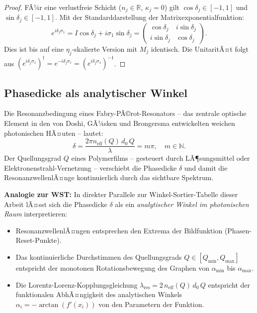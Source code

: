 ﻿\documentclass[12pt, a4paper]{article}
\theoremstyle{definition}
\begin{document}
	\begin{proof}
		FÃ¼r eine verlustfreie Schicht ($n_j \in \mathbb{R}$, $\kappa_j = 0$) gilt
		$\cos\delta_j \in [-1,1]$ und $\sin\delta_j \in [-1,1]$.
		Mit der Standarddarstellung der Matrixexponentialfunktion:
		\[
		e^{i\delta_j \sigma_1} = I\cos\delta_j + i\sigma_1\sin\delta_j
		= \begin{pmatrix}\cos\delta_j & i\sin\delta_j \\ i\sin\delta_j & \cos\delta_j\end{pmatrix}.
		\]
		Dies ist bis auf eine $\eta_j$-skalierte Version mit $M_j$ identisch.
		Die UnitaritÃ¤t folgt aus $(e^{i\delta_j\sigma_1})^\dagger = e^{-i\delta_j\sigma_1} = (e^{i\delta_j\sigma_1})^{-1}$.
	\end{proof}
	
	\subsection{Phasedicke als analytischer Winkel}
	
	Die Resonanzbedingung eines Fabry-PÃ©rot-Resonators -- das zentrale optische
	Element in den von Doshi, GÃ¼sken und Brongersma \cite{oqtum} entwickelten
	weichen photonischen HÃ¤uten -- lautet:
	\[
	\delta = \frac{2\pi n_\mathrm{eff}(Q)\, d_0\, Q}{\lambda} = m\pi, \quad m \in \mathbb{N}.
	\]
	Der Quellungsgrad $Q$ eines Polymerfilms -- gesteuert durch LÃ¶sungsmittel
	oder Elektronen\-strahl-Vernetzung -- verschiebt die Phasedicke $\delta$ und
	damit die ResonanzwellenlÃ¤nge kontinuierlich durch das sichtbare Spektrum.
	
	\medskip
	\noindent\textbf{Analogie zur WST:} In direkter Parallele zur
	Winkel-Sortier-Tabelle dieser Arbeit lÃ¤sst sich die Phasedicke $\delta$ als
	ein \emph{analytischer Winkel im photonischen Raum} interpretieren:
	\begin{itemize}
		\item ResonanzwellenlÃ¤ngen entsprechen den Extrema der Bildfunktion (Phasen-Reset-Punkte).
		\item Das kontinuierliche Durchstimmen des Quellungsgrads $Q \in [Q_\mathrm{min}, Q_\mathrm{max}]$
		entspricht der monotonen Rotationsbewegung des Graphen von
		$\alpha_\mathrm{min}$ bis $\alpha_\mathrm{max}$.
		\item Die Lorentz-Lorenz-Kopplungsgleichung
		$\lambda_\mathrm{res} = 2\, n_\mathrm{eff}(Q)\, d_0\, Q$
		entspricht der funktionalen AbhÃ¤ngigkeit des analytischen Winkels
		$\alpha_i = -\arctan(f'(x_i))$ von den Parametern der Funktion.
	\end{itemize}
	
\end{document}
